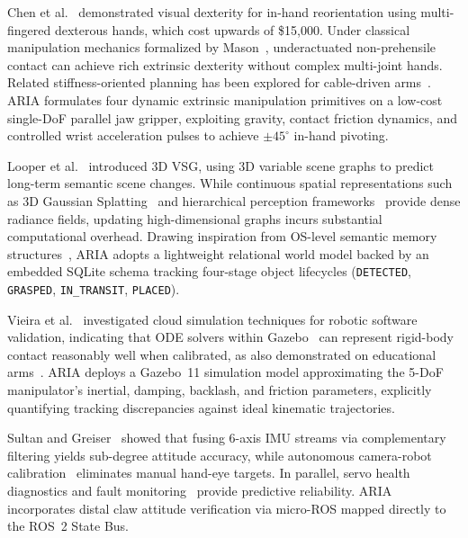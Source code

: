 \documentclass[journal]{IEEEtran}
\begin{document}
Chen et al.~\cite{aria_135_chen_2023_visual} demonstrated visual dexterity for in-hand reorientation using multi-fingered dexterous hands, which cost upwards of \$15{,}000. Under classical manipulation mechanics formalized by Mason~\cite{mason2001mechanics}, underactuated non-prehensile contact can achieve rich extrinsic dexterity without complex multi-joint hands. Related stiffness-oriented planning has been explored for cable-driven arms~\cite{aria_044_pang_2025_highstiffness}. ARIA formulates four dynamic extrinsic manipulation primitives on a low-cost single-DoF parallel jaw gripper, exploiting gravity, contact friction dynamics, and controlled wrist acceleration pulses to achieve $\pm 45^\circ$ in-hand pivoting.

Looper et al.~\cite{aria_004_looper_2023_3d} introduced 3D VSG, using 3D variable scene graphs to predict long-term semantic scene changes. While continuous spatial representations such as 3D Gaussian Splatting~\cite{aria_002_kerbl_2023_3d} and hierarchical perception frameworks~\cite{aria_003_hughes_2023_foundations} provide dense radiance fields, updating high-dimensional graphs incurs substantial computational overhead. Drawing inspiration from OS-level semantic memory structures~\cite{aria_088_packer_2023_memgpt}, ARIA adopts a lightweight relational world model backed by an embedded SQLite schema tracking four-stage object lifecycles (\texttt{DETECTED}, \texttt{GRASPED}, \texttt{IN\_TRANSIT}, \texttt{PLACED}).

Vieira et al.~\cite{aria_117_vieira_2025_application} investigated cloud simulation techniques for robotic software validation, indicating that ODE solvers within Gazebo~\cite{gazebo_2004} can represent rigid-body contact reasonably well when calibrated, as also demonstrated on educational arms~\cite{aria_007_agha_2021_a}. ARIA deploys a Gazebo~11 simulation model approximating the 5-DoF manipulator's inertial, damping, backlash, and friction parameters, explicitly quantifying tracking discrepancies against ideal kinematic trajectories.

Sultan and Greiser~\cite{aria_118_team_2025_time} showed that fusing 6-axis IMU streams via complementary filtering yields sub-degree attitude accuracy, while autonomous camera-robot calibration~\cite{aria_006_chanrungmaneekul_2025_arccalib} eliminates manual hand-eye targets. In parallel, servo health diagnostics and fault monitoring~\cite{aria_086_ling_2023_prognostics} provide predictive reliability. ARIA incorporates distal claw attitude verification via micro-ROS mapped directly to the ROS~2 State Bus.
\end{document}

